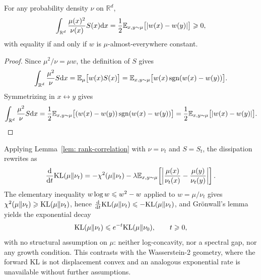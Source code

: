 \documentclass{article}
\begin{document}
\begin{lemma}
\label{lem: rank-correlation}
For any probability density $\nu$ on $\mathbb R^d$,
\begin{equation*}
    \int_{\mathbb R^d}\frac{\mu(x)^2}{\nu(x)}S(x)\mathrm{d} x = \frac{1}{2} \mathbb E_{x,y\sim\mu}\bigl[|w(x) - w(y)|\bigr] \geqslant 0,
\end{equation*}
with equality if and only if $w$ is $\mu$-almost-everywhere constant.
\end{lemma}

\begin{proof}
Since $\mu^2/\nu = \mu w$, the definition of $S$ gives
\begin{equation*}
    \int_{\mathbb R^d}\frac{\mu^2}{\nu}S\mathrm{d} x = \mathbb E_\mu\bigl[w(x)S(x)\bigr] = \mathbb E_{x,y\sim\mu}\bigl[w(x)\operatorname{sgn}(w(x) - w(y))\bigr].
\end{equation*}
Symmetrizing in $x\leftrightarrow y$ gives
\begin{equation*}
    \int_{\mathbb R^d}\frac{\mu^2}{\nu}S\mathrm{d} x = \frac{1}{2} \mathbb E_{x,y\sim\mu}\bigl[(w(x) - w(y))\operatorname{sgn}(w(x) - w(y))\bigr] = \frac{1}{2} \mathbb E_{x,y\sim\mu}\bigl[ |w(x) - w(y)| \bigr].
\end{equation*}
\end{proof}

Applying Lemma~\ref{lem: rank-correlation} with $\nu = \nu_t$ and $S = S_t$, the dissipation rewrites as
\begin{equation}
    \frac{\mathrm{d}}{\mathrm{d} t}\mathrm{KL}(\mu\|\nu_t) = -\chi^2(\mu\|\nu_t) - \lambda \mathbb E_{x,y\sim\mu}\!\left[ \left|\frac{\mu(x)}{\nu_t(x)} - \frac{\mu(y)}{\nu_t(y)}\right| \right].
    \label{eq: combined-rate}
\end{equation}
The elementary inequality $w\log w \leqslant w^2 - w$ applied to $w = \mu/\nu_t$ gives $\chi^2(\mu\|\nu_t) \geqslant \mathrm{KL}(\mu\|\nu_t)$, hence $\frac{\mathrm{d}}{\mathrm{d} t}\mathrm{KL}(\mu\|\nu_t) \leqslant -\mathrm{KL}(\mu\|\nu_t)$, and Gr\"onwall's lemma yields the exponential decay
\begin{equation}
    \mathrm{KL}(\mu\|\nu_t) \leqslant e^{-t} \mathrm{KL}(\mu\|\nu_0),\qquad t \geqslant 0,
    \label{eq: KL-exponential}
\end{equation}
with no structural assumption on $\mu$: neither log-concavity, nor a spectral gap, nor any growth condition. This contrasts with the Wasserstein-2 geometry, where the forward KL is not displacement convex and an analogous exponential rate is unavailable without further assumptions.
\end{document}
